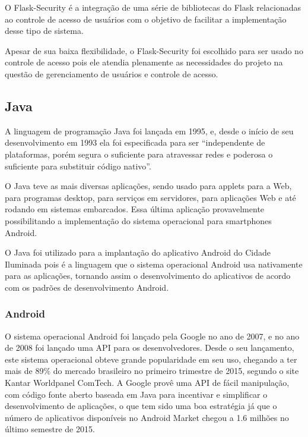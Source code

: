 \documentclass[
	article,			%
	11pt,				%
	oneside,			%
	a4paper,			%
	english,			%
	brazil,				%
	sumario=tradicional
	]{abntex2}
\begin{document}
O Flask-Security é a integração de uma série de bibliotecas do Flask relacionadas ao controle de acesso de usuários com o objetivo de facilitar a implementação desse tipo de sistema. \cite{flasksecurity}

Apesar de sua baixa flexibilidade, o Flask-Security foi escolhido para ser usado no controle de acesso pois ele atendia plenamente as necessidades do projeto na questão de gerenciamento de usuários e controle de acesso.

\subsection{Java}

A linguagem de programação Java foi lançada em 1995, e, desde o início de seu desenvolvimento em 1993 ela foi especificada para ser “independente de plataformas, porém segura o suficiente para atravessar redes e poderosa o suficiente para substituir código nativo”. \cite{java}

O Java teve as mais diversas aplicações, sendo usado para applets para a Web, para programas desktop, para serviços em servidores, para aplicações Web e até rodando em sistemas embarcados.
Essa última aplicação provavelmente possibilitando a implementação do sistema operacional para smartphones Android.

O Java foi utilizado para a implantação do aplicativo Android do Cidade Iluminada pois é a linguagem que o sistema operacional Android usa nativamente para as aplicações, tornando assim o desenvolvimento do aplicativos de acordo com os padrões de desenvolvimento Android.

\subsubsection{Android}

O sistema operacional Android foi lançado pela Google no ano de 2007, e no ano de 2008 foi lançado uma API para os desenvolvedores.
Desde o seu lançamento, este sistema operacional obteve grande popularidade em seu uso, chegando a ter mais de 89\% do mercado brasileiro no primeiro trimestre de 2015, segundo o site Kantar Worldpanel ComTech. \cite{comtech}
A Google provê uma API de fácil manipulação, com código fonte aberto baseada em Java para incentivar e simplificar o desenvolvimento de aplicações, o que tem sido uma boa estratégia já que o número de aplicativos disponíveis no Android Market chegou a 1.6 milhões no último semestre de 2015.
\end{document}
